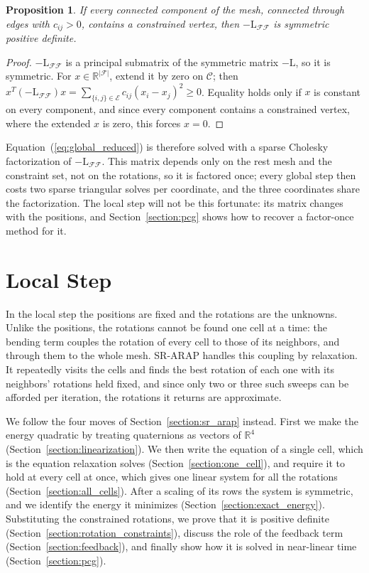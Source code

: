 \documentclass{birkjour}
\newtheorem{prop}[thm]{Proposition}
\theoremstyle{remark}
\numberwithin{equation}{section}
\begin{document}
\begin{prop}
\label{prop:laplacian_spd}
If every connected component of the mesh, connected through edges with $c_{ij} > 0$, contains a constrained vertex, then $-\mathrm L_{\mathcal F \mathcal F}$ is symmetric positive definite.
\end{prop}
\begin{proof}
$-\mathrm L_{\mathcal F \mathcal F}$ is a principal submatrix of the symmetric matrix $-\mathrm L$, so it is symmetric. For $x \in \mathbb R^{|\mathcal F|}$, extend it by zero on $\mathcal C$; then $x^T (-\mathrm L_{\mathcal F \mathcal F}) x = \sum_{\{i,j\} \in \mathcal E} c_{ij} (x_i - x_j)^2 \geq 0$. Equality holds only if $x$ is constant on every component, and since every component contains a constrained vertex, where the extended $x$ is zero, this forces $x = 0$.
\end{proof}

Equation~(\ref{eq:global_reduced}) is therefore solved with a sparse Cholesky factorization of $-\mathrm L_{\mathcal F \mathcal F}$. This matrix depends only on the rest mesh and the constraint set, not on the rotations, so it is factored once; every global step then costs two sparse triangular solves per coordinate, and the three coordinates share the factorization. The local step will not be this fortunate: its matrix changes with the positions, and Section~\ref{section:pcg} shows how to recover a factor-once method for it.

\section{Local Step}
\label{section:local_step}

In the local step the positions are fixed and the rotations are the unknowns. Unlike the positions, the rotations cannot be found one cell at a time: the bending term couples the rotation of every cell to those of its neighbors, and through them to the whole mesh. SR-ARAP handles this coupling by relaxation. It repeatedly visits the cells and finds the best rotation of each one with its neighbors' rotations held fixed, and since only two or three such sweeps can be afforded per iteration, the rotations it returns are approximate.

We follow the four moves of Section~\ref{section:sr_arap} instead. First we make the energy quadratic by treating quaternions as vectors of $\mathbb R^4$ (Section~\ref{section:linearization}). We then write the equation of a single cell, which is the equation relaxation solves (Section~\ref{section:one_cell}), and require it to hold at every cell at once, which gives one linear system for all the rotations (Section~\ref{section:all_cells}). After a scaling of its rows the system is symmetric, and we identify the energy it minimizes (Section~\ref{section:exact_energy}). Substituting the constrained rotations, we prove that it is positive definite (Section~\ref{section:rotation_constraints}), discuss the role of the feedback term (Section~\ref{section:feedback}), and finally show how it is solved in near-linear time (Section~\ref{section:pcg}).
\end{document}
